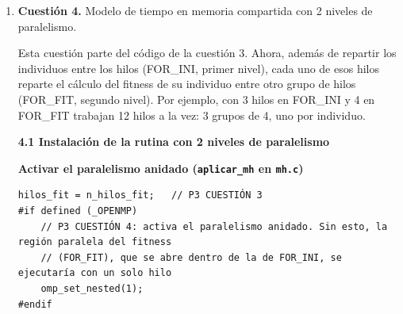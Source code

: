 \documentclass[12pt]{article}
\begin{document}
\begin{enumerate}
El problema es que la ecuación~1 supone que, con el doble de hilos, el trabajo se hace en la mitad de tiempo, y en este ordenador no pasa. En los tres casos, con muchos hilos el tiempo se queda más o menos en la mitad del tiempo con 1 hilo (2.02 frente a 3.51, 3.46 frente a 6.93 y 5.29 frente a 10.90). Si el límite fuera que no hay individuos para todos los hilos, cada hilo haría un individuo y el tiempo sería el mismo para cualquier NE, pero no es así: sigue creciendo con NE. Lo que limita es la memoria. Para calcular el fitness de un individuo hay que leer unos 128 millones de distancias de una matriz de 3.6 GB, saltando de una posición a otra. Esos datos casi nunca están en la caché, así que hay que ir a buscarlos a la memoria principal, y a partir de unos 4 hilos la memoria no da abasto para atender a más. Además, en un portátil el procesador baja la frecuencia cuando trabajan todos los núcleos a la vez. El modelo no tiene en cuenta nada de esto, como ya avisa el enunciado, y con una sola constante $k_h$ no puede reproducirlo.

\newpage
\item \textbf{Cuestión 4.} Modelo de tiempo en memoria compartida con 2 niveles de paralelismo.


Esta cuestión parte del código de la cuestión 3. Ahora, además de repartir los individuos entre los hilos (FOR\_INI, primer nivel), cada uno de esos hilos reparte el cálculo del fitness de su individuo entre otro grupo de hilos (FOR\_FIT, segundo nivel). Por ejemplo, con 3 hilos en FOR\_INI y 4 en FOR\_FIT trabajan 12 hilos a la vez: 3 grupos de 4, uno por individuo.

\medskip
\noindent\textbf{4.1 Instalación de la rutina con 2 niveles de paralelismo}\par
\smallskip

\medskip
\noindent\textbf{Activar el paralelismo anidado (\texttt{aplicar\_mh} en \texttt{mh.c})}\par
\smallskip

\begin{lstlisting}[style=EstiloC]
    hilos_fit = n_hilos_fit;   // P3 CUESTIÓN 3
#if defined (_OPENMP)
    // P3 CUESTIÓN 4: activa el paralelismo anidado. Sin esto, la región paralela del fitness
    // (FOR_FIT), que se abre dentro de la de FOR_INI, se ejecutaría con un solo hilo
    omp_set_nested(1);
#endif
\end{lstlisting}


\end{enumerate}
\end{document}
